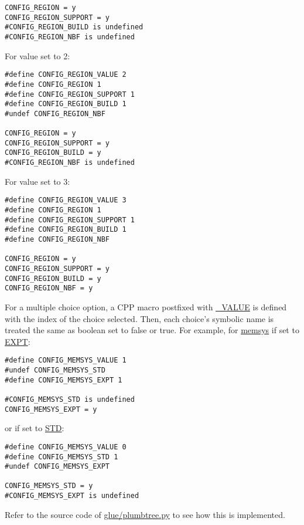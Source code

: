 \documentclass[a4paper]{article}
\begin{document}
\begin{description}
\begin{small}
\begin{verbatim}
CONFIG_REGION = y
CONFIG_REGION_SUPPORT = y
#CONFIG_REGION_BUILD is undefined
#CONFIG_REGION_NBF is undefined
\end{verbatim}
\end{small}

For value set to 2:
\begin{small}
\begin{verbatim}
#define CONFIG_REGION_VALUE 2
#define CONFIG_REGION 1
#define CONFIG_REGION_SUPPORT 1
#define CONFIG_REGION_BUILD 1
#undef CONFIG_REGION_NBF

CONFIG_REGION = y
CONFIG_REGION_SUPPORT = y
CONFIG_REGION_BUILD = y 
#CONFIG_REGION_NBF is undefined
\end{verbatim}
\end{small}

For value set to 3:
\begin{small}
\begin{verbatim}
#define CONFIG_REGION_VALUE 3
#define CONFIG_REGION 1
#define CONFIG_REGION_SUPPORT 1
#define CONFIG_REGION_BUILD 1
#define CONFIG_REGION_NBF

CONFIG_REGION = y
CONFIG_REGION_SUPPORT = y
CONFIG_REGION_BUILD = y
CONFIG_REGION_NBF = y
\end{verbatim}
\end{small}

For a multiple choice option, a CPP macro postfixed with \url{_VALUE}
is defined with the index of the choice selected. Then, each choice's
symbolic name is treated the same as boolean set to false or true. For
example, for \url{memsys} if set to \url{EXPT}:
\begin{small}
\begin{verbatim}
#define CONFIG_MEMSYS_VALUE 1
#undef CONFIG_MEMSYS_STD
#define CONFIG_MEMSYS_EXPT 1

#CONFIG_MEMSYS_STD is undefined
CONFIG_MEMSYS_EXPT = y
\end{verbatim}
\end{small}

or if set to \url{STD}:
\begin{small}
\begin{verbatim}
#define CONFIG_MEMSYS_VALUE 0
#define CONFIG_MEMSYS_STD 1
#undef CONFIG_MEMSYS_EXPT

CONFIG_MEMSYS_STD = y
#CONFIG_MEMSYS_EXPT is undefined
\end{verbatim}
\end{small}

Refer to the source code of \url{glue/plumbtree.py} to see how this is
implemented.


\end{description}
\end{document}
